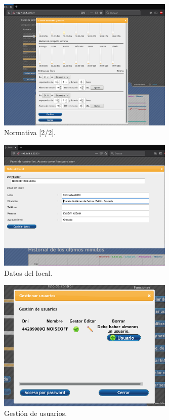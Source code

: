 \begin{figure}[ht]
    \centering
    \includegraphics[width=0.75\textwidth]{imagenes/interfaz/Interfaz_4_festivos_1.png}
    \caption{Normativa [2/2].}
\end{figure}

\begin{figure}[ht]
    \centering
    \includegraphics[width=0.75\textwidth]{imagenes/interfaz/Interfaz_5_datos_local.png}
    \caption{Datos del local.}
\end{figure}

\begin{figure}[ht]
    \centering
    \includegraphics[width=0.75\textwidth]{imagenes/interfaz/Interfaz_6_usuarios_0.png}
    \caption{Gestión de usuarios.}
\end{figure}

